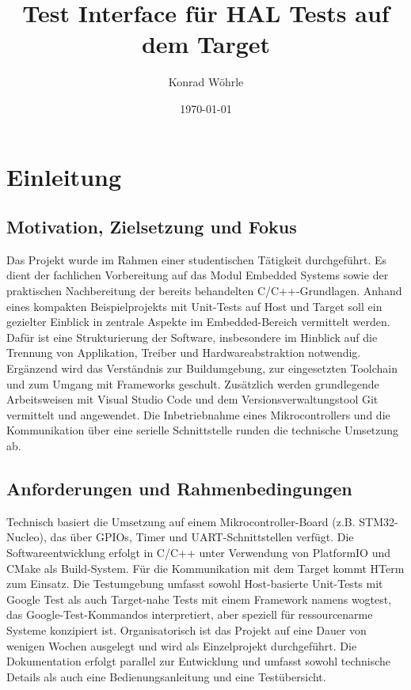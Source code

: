 \documentclass[12pt,a4paper]{article}
\title{Test Interface für HAL Tests auf dem Target}
\author{Konrad Wöhrle}
\date{\today}
\begin{document}
\maketitle
\newpage

\tableofcontents
\newpage

\section{Einleitung}
\subsection{Motivation, Zielsetzung und Fokus}

Das Projekt wurde im Rahmen einer studentischen Tätigkeit durchgeführt.
Es dient der fachlichen Vorbereitung auf das Modul Embedded Systems sowie der praktischen Nachbereitung der bereits behandelten C/C++-Grundlagen.
\newline
Anhand eines kompakten Beispielprojekts mit Unit-Tests auf Host und Target soll ein gezielter Einblick in zentrale Aspekte im Embedded-Bereich vermittelt werden. Dafür ist eine Strukturierung der Software, insbesondere im Hinblick auf die Trennung von Applikation, Treiber und Hardwareabstraktion notwendig. Ergänzend wird das Verständnis zur Buildumgebung, zur eingesetzten Toolchain und zum Umgang mit Frameworks geschult. Zusätzlich werden grundlegende Arbeitsweisen mit Visual Studio Code und dem Versionsverwaltungstool Git vermittelt und angewendet. Die Inbetriebnahme eines Mikrocontrollers und die Kommunikation über eine serielle Schnittstelle runden die technische Umsetzung ab.

\subsection{Anforderungen und Rahmenbedingungen}
Technisch basiert die Umsetzung auf einem Mikrocontroller-Board (z.B. STM32-Nucleo), das über GPIOs, Timer und UART-Schnittstellen verfügt. Die Softwareentwicklung erfolgt in C/C++ unter Verwendung von PlatformIO und CMake als Build-System. Für die Kommunikation mit dem Target kommt HTerm zum Einsatz. Die Testumgebung umfasst sowohl Host-basierte Unit-Tests mit Google Test als auch Target-nahe Tests mit einem  Framework namens wogtest, das Google-Test-Kommandos interpretiert, aber speziell für ressourcenarme Systeme konzipiert ist.
\newline
Organisatorisch ist das Projekt auf eine Dauer von wenigen Wochen ausgelegt und wird als Einzelprojekt durchgeführt. Die Dokumentation erfolgt parallel zur Entwicklung und umfasst sowohl technische Details als auch eine Bedienungsanleitung und eine Testübersicht.
\end{document}
